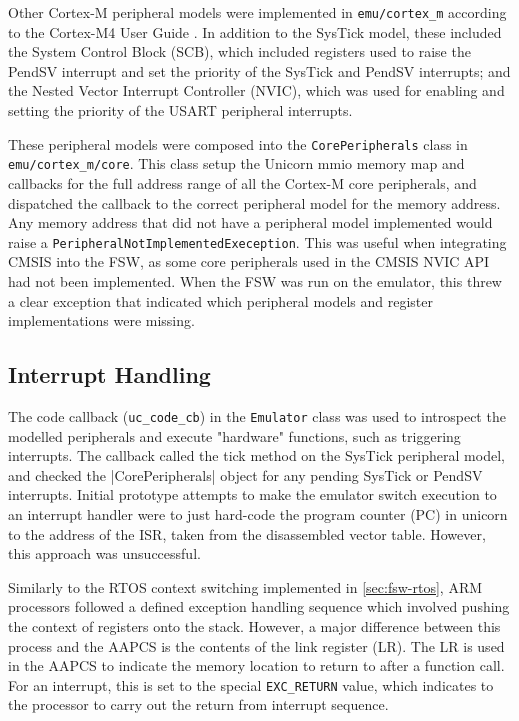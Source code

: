 \documentclass[../report.tex]{subfiles}
\begin{document}
Other Cortex-M peripheral models were implemented in \lstinline|emu/cortex_m|
according to the Cortex-M4 User Guide \citep{armcm4_manual}. In addition to the
SysTick model, these included the System Control Block (SCB), which included
registers used to raise the PendSV interrupt and set the priority of the
SysTick and PendSV interrupts; and the Nested Vector Interrupt Controller
(NVIC), which was used for enabling and setting the priority of the USART
peripheral interrupts.

These peripheral models were composed into the \lstinline|CorePeripherals|
class in \lstinline|emu/cortex_m/core|. This class setup the Unicorn mmio
memory map and callbacks for the full address range of all the Cortex-M core
peripherals, and dispatched the callback to the correct peripheral model for
the memory address. Any memory address that did not have a peripheral model
implemented would raise a \lstinline|PeripheralNotImplementedExeception|. This
was useful when integrating CMSIS into the FSW, as some core peripherals used
in the CMSIS NVIC API had not been implemented. When the FSW was run on the
emulator, this threw a clear exception that indicated which peripheral models
and register implementations were missing.

\subsection{Interrupt Handling}

The code callback (\lstinline|uc_code_cb|) in the \lstinline|Emulator| class
was used to introspect the modelled peripherals and execute "hardware"
functions, such as triggering interrupts. The callback called the tick method
on the SysTick peripheral model, and checked the |CorePeripherals| object for
any pending SysTick or PendSV interrupts. Initial prototype attempts to make
the emulator switch execution to an interrupt handler were to just hard-code the
program counter (PC) in unicorn to the address of the ISR, taken from the
disassembled vector table. However, this approach was unsuccessful.

Similarly to the RTOS context switching implemented in \autoref{sec:fsw-rtos}, ARM
processors followed a defined exception handling sequence \citep{ARM_Exception}
which involved pushing the context of registers onto the stack. However, a
major difference between this process and the AAPCS \citep{AAPCS} is the
contents of the link register (LR). The LR is used in the AAPCS to indicate the
memory location to return to after a function call. For an interrupt, this is
set to the special \lstinline|EXC_RETURN| value, which indicates to the
processor to carry out the return from interrupt sequence.
\end{document}
